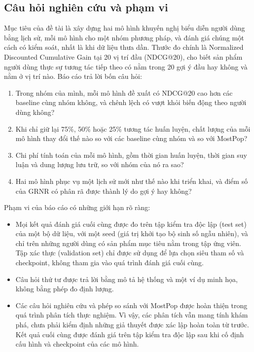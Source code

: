\subsection{Câu hỏi nghiên cứu và phạm vi}
\label{sec:intro-rq}

Mục tiêu của đề tài là xây dựng hai mô hình khuyến nghị biểu diễn người dùng bằng lịch sử, mỗi mô hình cho một nhóm phương pháp, và đánh giá chúng một cách có kiểm soát, nhất là khi dữ liệu thưa dần. Thước đo chính là Normalized Discounted Cumulative Gain tại 20 vị trí đầu (NDCG@20), cho biết sản phẩm người dùng thực sự tương tác tiếp theo có nằm trong 20 gợi ý đầu hay không và nằm ở vị trí nào. Báo cáo trả lời bốn câu hỏi:
\begin{enumerate}
\item Trong nhóm của mình, mỗi mô hình đề xuất có NDCG@20 cao hơn các baseline cùng nhóm không, và chênh lệch có vượt khỏi biến động theo người dùng không?
\item Khi chỉ giữ lại 75\%, 50\% hoặc 25\% tương tác huấn luyện, chất lượng của mỗi mô hình thay đổi thế nào so với các baseline cùng nhóm và so với MostPop?
\item Chi phí tính toán của mỗi mô hình, gồm thời gian huấn luyện, thời gian suy luận và dung lượng lưu trữ, so với nhóm của nó ra sao?
\item Hai mô hình phục vụ một lịch sử mới như thế nào khi triển khai, và điểm số của GRNR có phân rã được thành lý do gợi ý hay không?
\end{enumerate}

Phạm vi của báo cáo có những giới hạn rõ ràng:
\begin{itemize}
\item Mọi kết quả đánh giá cuối cùng được đo trên tập kiểm tra độc lập (test set) của một bộ dữ liệu, với một seed (giá trị khởi tạo bộ sinh số ngẫu nhiên), và chỉ trên những người dùng có sản phẩm mục tiêu nằm trong tập ứng viên. Tập xác thực (validation set) chỉ được sử dụng để lựa chọn siêu tham số và checkpoint, không tham gia vào quá trình đánh giá cuối cùng.
\item Câu hỏi thứ tư được trả lời bằng mô tả hệ thống và một ví dụ minh họa, không bằng phép đo định lượng.
\item Các câu hỏi nghiên cứu và phép so sánh với MostPop được hoàn thiện trong quá trình phân tích thực nghiệm. Vì vậy, các phân tích vẫn mang tính khám phá, chưa phải kiểm định những giả thuyết được xác lập hoàn toàn từ trước. Kết quả cuối cùng được đánh giá trên tập kiểm tra độc lập sau khi cố định cấu hình và checkpoint của các mô hình.
\end{itemize}
